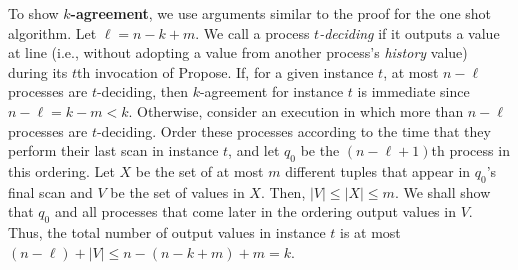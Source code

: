\documentclass[11pt]{article}
\newcounter{linenum}
\newcommand{\lref}[1]{\linenumref{#1}}
\begin{document}
To show {\bf $k$-agreement}, we use arguments similar to the proof for the one shot algorithm.
Let $\ell=n-k+m$.
We call a process \emph{$t$-deciding} if it outputs a value at line \lref{output-rep} (i.e., without
adopting a value from another process's \textit{history} value) during
its $t$th invocation of {\sc Propose}.
If, for a given instance $t$, 
at most $n-\ell$ processes are $t$-deciding, 
then $k$-agreement for instance $t$ is immediate since $n-\ell=k-m<k$.   
Otherwise, consider an execution in which more than $n-\ell$ processes
are $t$-deciding.
Order these processes according to the time that they perform their last scan in instance $t$,
and let $q_0$ be the $(n-\ell+1)$th process in this ordering.
Let $X$ be the set of at most $m$ different tuples that appear in
$q_0$'s final scan and $V$ be the set of values in $X$.  Then, $|V|\leq
|X|\leq m$.
We shall show that $q_0$ and all processes that come later in the ordering
output values in $V$.  
Thus, the total number of output values in instance $t$ 
is at most $(n-\ell) + |V| \leq n-(n-k+m)+m = k$.
\end{document}
